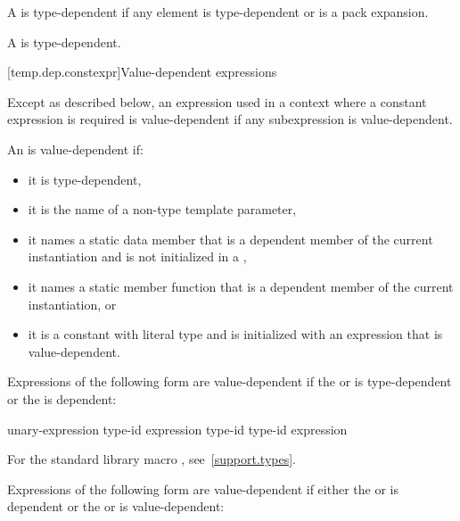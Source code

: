 \pnum
A  is type-dependent if any element is
type-dependent or is a pack expansion.

\pnum
A  is type-dependent.

[temp.dep.constexpr]{Value-dependent expressions}

\pnum
Except as described below, an expression used in a context where a
constant expression is required is value-dependent if any
subexpression is value-dependent.

\pnum
An
is value-dependent if:

\begin{itemize}
\item
it is type-dependent,
\item
it is the name of a non-type template parameter,
\item
it names a static data member that is a dependent member of the current
instantiation and is not initialized in a ,
\item
it names a static member function that is a dependent member of the current
instantiation, or
\item
it is a constant with literal type and is initialized with an
expression that is value-dependent.
\end{itemize}

Expressions of the following form are value-dependent if the
 or 
is type-dependent or the
is dependent:

\begin{ncsimplebnf}
 unary-expression\br
{} \terminal{(} type-id \terminal{)}\br
{} \terminal{(} expression \terminal{)}\br
{} \terminal{(} type-id \terminal{)}\br
{} \terminal{(} type-id \terminal{)}\br
{} \terminal{(} expression \terminal{)}
\end{ncsimplebnf}

\begin{note} For the standard library macro ,
see~\ref{support.types}.\end{note}

\pnum
Expressions of the following form are value-dependent if either the
or
is dependent or the
or
is value-dependent:

